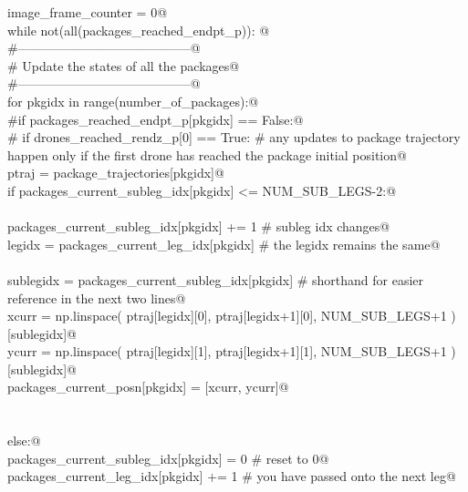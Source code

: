 \documentclass[10.0pt]{report}
\begin{document}
\begin{appendices}
\begin{flushleft}
\begin{list}{}{}
\mbox{}\verb@    image_frame_counter = 0@\\
\mbox{}\verb@    while not(all(packages_reached_endpt_p)): @\\
\mbox{}\verb@        #-----------------------------------------@\\
\mbox{}\verb@        # Update the states of all the packages@\\
\mbox{}\verb@        #-----------------------------------------@\\
\mbox{}\verb@        for pkgidx in range(number_of_packages):@\\
\mbox{}\verb@            #if packages_reached_endpt_p[pkgidx] == False:@\\
\mbox{}\verb@            #    if drones_reached_rendz_p[0] == True:  # any updates to package trajectory happen only if the first drone has reached the package initial position@\\
\mbox{}\verb@                  ptraj = package_trajectories[pkgidx]@\\
\mbox{}\verb@                  if packages_current_subleg_idx[pkgidx] <= NUM_SUB_LEGS-2:@\\
\mbox{}\verb@@\\
\mbox{}\verb@                    packages_current_subleg_idx[pkgidx] += 1     # subleg idx changes@\\
\mbox{}\verb@                    legidx    = packages_current_leg_idx[pkgidx] # the legidx remains the same@\\
\mbox{}\verb@@\\
\mbox{}\verb@                    sublegidx = packages_current_subleg_idx[pkgidx] # shorthand for easier reference in the next two lines@\\
\mbox{}\verb@                    xcurr = np.linspace( ptraj[legidx][0], ptraj[legidx+1][0], NUM_SUB_LEGS+1 )[sublegidx]@\\
\mbox{}\verb@                    ycurr = np.linspace( ptraj[legidx][1], ptraj[legidx+1][1], NUM_SUB_LEGS+1 )[sublegidx]@\\
\mbox{}\verb@                    packages_current_posn[pkgidx]  = [xcurr, ycurr]@\\
\mbox{}\verb@@\\
\mbox{}\verb@@\\
\mbox{}\verb@                  else:@\\
\mbox{}\verb@                    packages_current_subleg_idx[pkgidx] = 0 # reset to 0@\\
\mbox{}\verb@                    packages_current_leg_idx[pkgidx]   += 1 # you have passed onto the next leg@\\

\end{list}
\end{flushleft}
\end{appendices}
\end{document}
